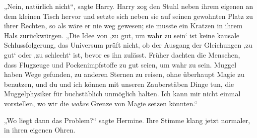 „Nein, natürlich nicht“, sagte Harry. Harry zog den Stuhl neben ihrem eigenen an dem kleinen Tisch hervor und setzte sich neben sie auf seinen gewohnten Platz zu ihrer Rechten, so als wäre er nie weg gewesen; sie musste ein Kratzen in ihrem Hals zurückwürgen. „Die Idee von ‚zu gut, um wahr zu sein‘ ist keine kausale Schlussfolgerung, das Universum prüft nicht, ob der Ausgang der Gleichungen ‚zu gut‘ oder ‚zu schlecht‘ ist, bevor es ihn zulässt. Früher dachten die Menschen, dass Flugzeuge und Pockenimpfstoffe zu gut seien, um wahr zu sein. Muggel haben Wege gefunden, zu anderen Sternen zu reisen, ohne überhaupt Magie zu benutzen, und du und ich können mit unseren Zauberstäben Dinge tun, die Muggelphysiker für buchstäblich unmöglich halten. Ich kann mir nicht einmal vorstellen, wo wir die \emph{wahre} Grenze von Magie setzen könnten.“

„Wo liegt dann das Problem?“ sagte Hermine. Ihre Stimme klang jetzt normaler, in ihren eigenen Ohren.

